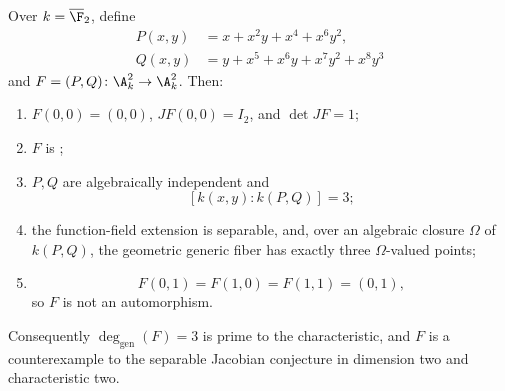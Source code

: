 \begin{theorem}\label{thm:main}
Over \(k=\overline{\F}_2\), define
\[
\begin{aligned}
 P(x,y)&=x+x^2y+x^4+x^6y^2,\\
 Q(x,y)&=y+x^5+x^6y+x^7y^2+x^8y^3
\end{aligned}
\]
and \(F=(P,Q)\colon\A_k^2\to\A_k^2\).  Then:
\begin{enumerate}
\renewcommand{\labelenumi}{\textup{(\roman{enumi})}}
  \item \(F(0,0)=(0,0)\), \(JF(0,0)=I_2\), and \(\det JF=1\);
  \item \(F\) is \etale{};
  \item \(P,Q\) are algebraically independent and
  \[
    [k(x,y):k(P,Q)]=3;
  \]
  \item the function-field extension is separable, and, over an algebraic
  closure \(\Omega\) of \(k(P,Q)\), the geometric generic fiber has exactly
  three \(\Omega\)-valued points;
  \item
  \[
    F(0,1)=F(1,0)=F(1,1)=(0,1),
  \]
  so \(F\) is not an automorphism.
\end{enumerate}
Consequently \(\deg_{\mathrm{gen}}(F)=3\) is prime to the characteristic, and
\(F\) is a counterexample to the separable Jacobian conjecture in dimension
two and characteristic two.
\end{theorem}
